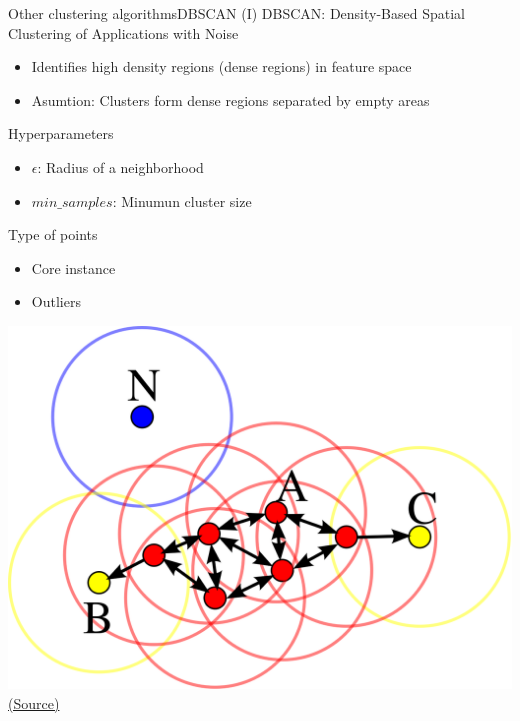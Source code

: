 \documentclass[10pt,compress]{beamer} %
\begin{document}
\begin{frame}{Other clustering algorithms}{DBSCAN (I)}
	DBSCAN: Density-Based Spatial Clustering of Applications with Noise
	\begin{itemize}
		\item Identifies high density regions (dense regions) in feature space
        \item Asumtion: Clusters form dense regions separated by empty areas
	\end{itemize}
    Hyperparameters
    \begin{itemize}
        \item $\epsilon$: Radius of a neighborhood
        \item $min\_samples$: Minumun cluster size
    \end{itemize}

    Type of points
    \begin{itemize}
        \item Core instance
        \item Outliers
    \end{itemize}

    \vspace{-3cm}
	\begin{flushright} 
        \includegraphics[width=0.5\linewidth]{figs/dbscan.png}
	    \scriptsize\href{https://en.wikipedia.org/wiki/DBSCAN}{(Source)}\hspace{20cm}
    \end{flushright}
\end{frame}

\end{document}
